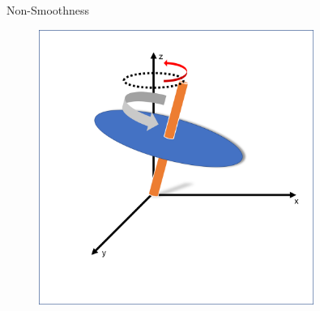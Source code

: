 \documentclass[10pt]{beamer}
\begin{document}
\begin{frame}{Non-Smoothness}

\begin{figure}[h]
	\centering
	\includegraphics[width=0.8\textwidth]{sphere1.png}
\end{figure}

\end{frame}
\end{document}
